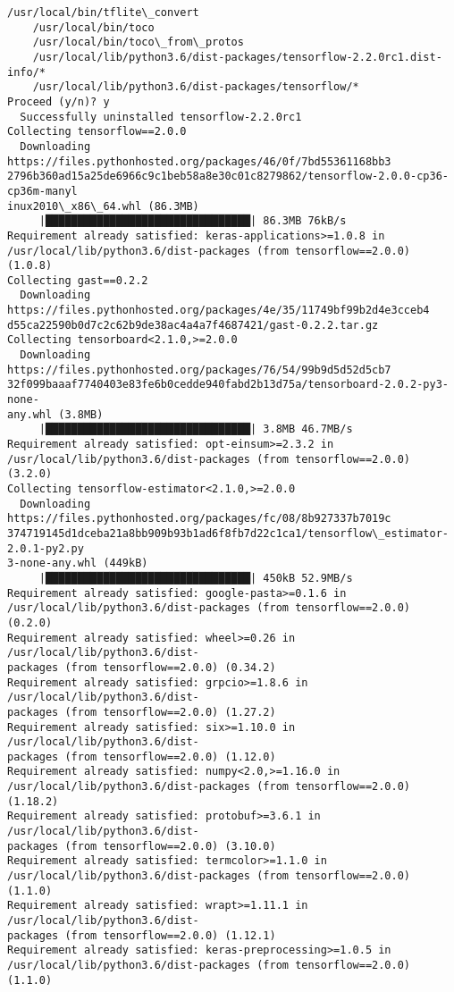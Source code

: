 \documentclass[11pt]{article}
\begin{document}
\begin{Verbatim}[commandchars=\\\{\}]
    /usr/local/bin/tflite\_convert
    /usr/local/bin/toco
    /usr/local/bin/toco\_from\_protos
    /usr/local/lib/python3.6/dist-packages/tensorflow-2.2.0rc1.dist-info/*
    /usr/local/lib/python3.6/dist-packages/tensorflow/*
Proceed (y/n)? y
  Successfully uninstalled tensorflow-2.2.0rc1
Collecting tensorflow==2.0.0
  Downloading https://files.pythonhosted.org/packages/46/0f/7bd55361168bb3
2796b360ad15a25de6966c9c1beb58a8e30c01c8279862/tensorflow-2.0.0-cp36-cp36m-manyl
inux2010\_x86\_64.whl (86.3MB)
     |████████████████████████████████| 86.3MB 76kB/s
Requirement already satisfied: keras-applications>=1.0.8 in
/usr/local/lib/python3.6/dist-packages (from tensorflow==2.0.0) (1.0.8)
Collecting gast==0.2.2
  Downloading https://files.pythonhosted.org/packages/4e/35/11749bf99b2d4e3cceb4
d55ca22590b0d7c2c62b9de38ac4a4a7f4687421/gast-0.2.2.tar.gz
Collecting tensorboard<2.1.0,>=2.0.0
  Downloading https://files.pythonhosted.org/packages/76/54/99b9d5d52d5cb7
32f099baaaf7740403e83fe6b0cedde940fabd2b13d75a/tensorboard-2.0.2-py3-none-
any.whl (3.8MB)
     |████████████████████████████████| 3.8MB 46.7MB/s
Requirement already satisfied: opt-einsum>=2.3.2 in
/usr/local/lib/python3.6/dist-packages (from tensorflow==2.0.0) (3.2.0)
Collecting tensorflow-estimator<2.1.0,>=2.0.0
  Downloading https://files.pythonhosted.org/packages/fc/08/8b927337b7019c
374719145d1dceba21a8bb909b93b1ad6f8fb7d22c1ca1/tensorflow\_estimator-2.0.1-py2.py
3-none-any.whl (449kB)
     |████████████████████████████████| 450kB 52.9MB/s
Requirement already satisfied: google-pasta>=0.1.6 in
/usr/local/lib/python3.6/dist-packages (from tensorflow==2.0.0) (0.2.0)
Requirement already satisfied: wheel>=0.26 in /usr/local/lib/python3.6/dist-
packages (from tensorflow==2.0.0) (0.34.2)
Requirement already satisfied: grpcio>=1.8.6 in /usr/local/lib/python3.6/dist-
packages (from tensorflow==2.0.0) (1.27.2)
Requirement already satisfied: six>=1.10.0 in /usr/local/lib/python3.6/dist-
packages (from tensorflow==2.0.0) (1.12.0)
Requirement already satisfied: numpy<2.0,>=1.16.0 in
/usr/local/lib/python3.6/dist-packages (from tensorflow==2.0.0) (1.18.2)
Requirement already satisfied: protobuf>=3.6.1 in /usr/local/lib/python3.6/dist-
packages (from tensorflow==2.0.0) (3.10.0)
Requirement already satisfied: termcolor>=1.1.0 in
/usr/local/lib/python3.6/dist-packages (from tensorflow==2.0.0) (1.1.0)
Requirement already satisfied: wrapt>=1.11.1 in /usr/local/lib/python3.6/dist-
packages (from tensorflow==2.0.0) (1.12.1)
Requirement already satisfied: keras-preprocessing>=1.0.5 in
/usr/local/lib/python3.6/dist-packages (from tensorflow==2.0.0) (1.1.0)

\end{Verbatim}
\end{document}
